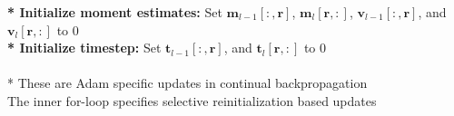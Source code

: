 \documentclass[review, number,3p]{elsarticle}
\begin{document}
\begin{algorithm}
{{    \textbf{* Initialize moment estimates:} Set $\textbf{m}_{l-1}[:, \textbf{r}]$, $\textbf{m}_{l}[\textbf{r}, :]$, $\textbf{v}_{l-1}[:, \textbf{r}]$, and $\textbf{v}_{l}[\textbf{r}, :]$ to $0$ \\
    \textbf{* Initialize timestep:} Set $\textbf{t}_{l-1}[:, \textbf{r}]$, and $\textbf{t}_{l}[\textbf{r}, :]$ to $0$ \\
}
}
\hrulefill\\
* These are Adam specific updates in continual backpropagation \\
The inner for-loop specifies selective reinitialization based updates
\end{algorithm}
\end{document}

